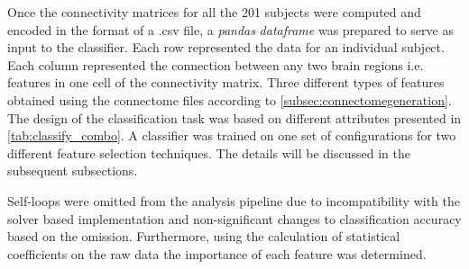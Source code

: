 \documentclass[msthesis.tex]{subfiles}
\begin{document}

Once the connectivity matrices for all the 201 subjects were computed and encoded in the format of a .csv file, a \textit{pandas} \textit{dataframe} was prepared to serve as input to the classifier. Each row represented the data for an individual subject. Each column represented the connection between any two brain regions i.e. features in one cell of the connectivity matrix. Three different types of features obtained using the connectome files according to \autoref{subsec:connectomegeneration}. The design of the classification task was based on different attributes presented in \autoref{tab:classify_combo}. A classifier was trained on one set of configurations for two different feature selection techniques. The details will be discussed in the subsequent subsections.

Self-loops were omitted from the analysis pipeline due to incompatibility with the solver based implementation and non-significant changes to classification accuracy based on the omission. Furthermore, using the calculation of statistical coefficients on the raw data the importance of each feature was determined. 
\end{document}
